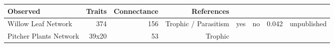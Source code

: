 \begin{longtable}[]{@{}lrrrrrrr@{}}
\begin{minipage}[b]{0.05\columnwidth}
Observed\strut
\end{minipage} & \begin{minipage}[b]{0.04\columnwidth}\raggedleft\strut
Traits\strut
\end{minipage} & \begin{minipage}[b]{0.06\columnwidth}\raggedleft\strut
Connectance\strut
\end{minipage} & \begin{minipage}[b]{0.22\columnwidth}\raggedleft\strut
References\strut
\end{minipage}\tabularnewline
\midrule
\endhead
\begin{minipage}[t]{0.15\columnwidth}\raggedright\strut
Willow Leaf Network\strut
\end{minipage} & \begin{minipage}[t]{0.07\columnwidth}\raggedleft\strut
374\strut
\end{minipage} & \begin{minipage}[t]{0.07\columnwidth}\raggedleft\strut
156\strut
\end{minipage} & \begin{minipage}[t]{0.11\columnwidth}\raggedleft\strut
Trophic / Parasitism\strut
\end{minipage} & \begin{minipage}[t]{0.05\columnwidth}\raggedleft\strut
yes\strut
\end{minipage} & \begin{minipage}[t]{0.04\columnwidth}\raggedleft\strut
no\strut
\end{minipage} & \begin{minipage}[t]{0.06\columnwidth}\raggedleft\strut
0.042\strut
\end{minipage} & \begin{minipage}[t]{0.22\columnwidth}\raggedleft\strut
unpublished\strut
\end{minipage}\tabularnewline
\begin{minipage}[t]{0.15\columnwidth}\raggedright\strut
Pitcher Plants Network\strut
\end{minipage} & \begin{minipage}[t]{0.07\columnwidth}\raggedleft\strut
39x20\strut
\end{minipage} & \begin{minipage}[t]{0.07\columnwidth}\raggedleft\strut
53\strut
\end{minipage} & \begin{minipage}[t]{0.11\columnwidth}\raggedleft\strut
Trophic\strut
\end{minipage} & \begin{minipage}[t]{0.05\columnwidth}\raggedleft\strut

\end{minipage}
\end{longtable}
